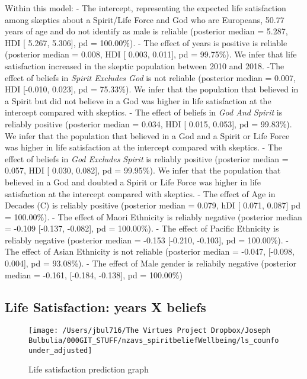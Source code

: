 \documentclass[
  english,
  man,floatsintext]{apa6}
\begin{document}
Within this model:
- The intercept, representing the expected life satisfaction among skeptics about a Spirit/Life Force and God who are Europeans, 50.77 years of age and do not identify as male is reliable (posterior median = 5.287, HDI {[} 5.267, 5.306{]}, pd = 100.00\%).
- The effect of years is positive is reliable (posterior median = 0.008, HDI {[} 0.003, 0.011{]}, pd = 99.75\%). We infer that life satisfaction increased in the skeptic population between 2010 and 2018.
-The effect of beliefs in \emph{Spirit Excludes God} is not reliable (posterior median = 0.007, HDI {[}-0.010, 0.023{]}, pd = 75.33\%). We infer that the population that believed in a Spirit but did not believe in a God was higher in life satisfaction at the intercept compared with skeptics.
- The effect of beliefs in \emph{God And Spirit} is reliably positive (posterior median = 0.034, HDI {[} 0.015, 0.053{]}, pd = 99.83\%). We infer that the population that believed in a God and a Spirit or Life Force was higher in life satisfaction at the intercept compared with skeptics.
- The effect of beliefs in \emph{God Excludes Spirit} is reliably positive (posterior median = 0.057, HDI {[} 0.030, 0.082{]}, pd = 99.95\%). We infer that the population that believed in a God and doubted a Spirit or Life Force was higher in life satisfaction at the intercept compared with skeptics.
- The effect of Age in Decades (C) is reliably positive (posterior median = 0.079, hDI {[} 0.071, 0.087{]} pd = 100.00\%).
- The effect of Maori Ethnicity is reliably negative (posterior median = -0.109 \textbar{} {[}-0.137, -0.082{]}, pd = 100.00\%).
- The effect of Pacific Ethnicity is reliably negative (posterior median = -0.153 \textbar{} {[}-0.210, -0.103{]}, pd = 100.00\%).
- The effect of Asian Ethnicity is not reliable (posterior median = -0.047, {[}-0.098, 0.004{]}, pd = 93.08\%).
- The effect of Male gender is reliabily negative (posterior median = -0.161, {[}-0.184, -0.138{]}, pd = 100.00\%)

\hypertarget{life-satisfaction-years-x-beliefs}{%
\subsection{Life Satisfaction: years X beliefs}\label{life-satisfaction-years-x-beliefs}}

\begin{figure}
\texttt{[image: /Users/jbul716/The Virtues Project Dropbox/Joseph Bulbulia/000GIT\_STUFF/nzavs\_spiritbeliefWellbeing/ls\_counfounder\_adjusted]} \caption{Life satisfaction prediction graph}\label{fig:unnamed-chunk-3}
\end{figure}
\end{document}
